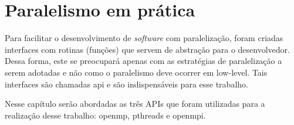 \chapter{Paralelismo em prática}

Para facilitar o desenvolvimento de \textit{software} com paralelização, foram 
criadas interfaces com rotinas (funções) que servem de abstração para o desenvolvedor.
Dessa forma, este se preocupará apenas com as estratégias de paralelização a 
serem adotadas e não como o paralelismo deve ocorrer em \gls{low-level}. Tais interfaces 
são chamadas \acrfull{api} e são indispensáveis para esse trabalho.

Nesse capítulo serão abordadas as três \glspl{API} que foram utilizadas para a 
realização desse trabalho: \acrshort{openmp}, \acrshort{pthreads} e \acrshort{openmpi}.






